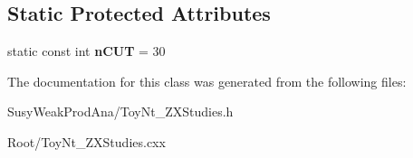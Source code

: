 \subsection*{Static Protected Attributes}
\begin{DoxyCompactItemize}
\item 
\hypertarget{classToyNt__ZXStudies_a001fe31fbe3a00779bee3f985ed6ec0c}{
static const int {\bfseries nCUT} = 30}
\label{classToyNt__ZXStudies_a001fe31fbe3a00779bee3f985ed6ec0c}

\end{DoxyCompactItemize}


The documentation for this class was generated from the following files:\begin{DoxyCompactItemize}
\item 
SusyWeakProdAna/ToyNt\_\-ZXStudies.h\item 
Root/ToyNt\_\-ZXStudies.cxx\end{DoxyCompactItemize}
